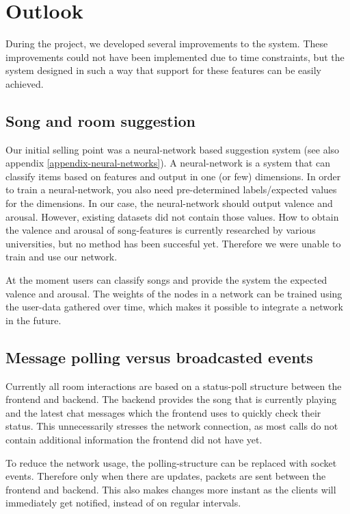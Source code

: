 \chapter{Outlook}
During the project, we developed several improvements to the system.
These improvements could not have been implemented due to time constraints, but the system designed in such a way that support for these features can be easily achieved.

\section{Song and room suggestion}
\label{outlook-neural}
Our initial selling point was a neural-network based suggestion system (see also appendix \ref{appendix-neural-networks}).
A neural-network is a system that can classify items based on features and output in one (or few) dimensions.
In order to train a neural-network, you also need pre-determined labels/expected values for the dimensions.
In our case, the neural-network should output \gls{valence} and \gls{arousal}.
However, existing datasets did not contain those values.
How to obtain the valence and arousal of song-features is currently researched by various universities, but no method has been succesful yet.
Therefore we were unable to train and use our network.

At the moment users can classify songs and provide the system the expected valence and arousal.
The weights of the nodes in a network can be trained using the user-data gathered over time, which makes it possible to integrate a network in the future.

\section{Message polling versus broadcasted events}
Currently all room interactions are based on a status-poll structure between the frontend and backend.
The backend provides the song that is currently playing and the latest chat messages which the frontend uses to quickly check their status.
This unnecessarily stresses the network connection, as most calls do not contain additional information the frontend did not have yet.

To reduce the network usage, the polling-structure can be replaced with socket events.
Therefore only when there are updates, packets are sent between the frontend and backend.
This also makes changes more instant as the clients will immediately get notified, instead of on regular intervals.

